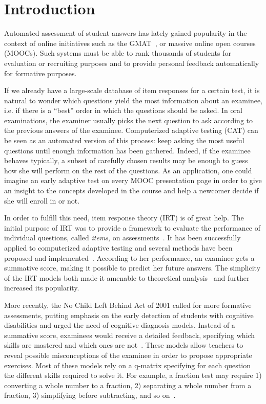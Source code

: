 \documentclass{edm_template}
\begin{document}

\newpage

\section{Introduction}
Automated assessment of student answers has lately gained popularity in the context of online initiatives such as the GMAT~\cite{Rudner2010}, or massive online open courses (MOOCs). Such systems must be able to rank thousands of students for evaluation or recruiting purposes and to provide personal feedback automatically for formative purposes.

If we already have a large-scale database of item responses for a certain test, it is natural to wonder which questions yield the most information about an examinee, i.e. if there is a ``best'' order in which the questions should be asked. In oral examinations, the examiner usually picks the next question to ask according to the previous answers of the examinee. Computerized adaptive testing (CAT) can be seen as an automated version of this process: keep asking the most useful questions until enough information has been gathered. Indeed, if the examinee behaves typically, a subset of carefully chosen results may be enough to guess how she will perform on the rest of the questions. As an application, one could imagine an early adaptive test on every MOOC presentation page in order to give an insight to the concepts developed in the course and help a newcomer decide if she will enroll in or not.

In order to fulfill this need, item response theory (IRT) is of great help. The initial purpose of IRT was to provide a framework to evaluate the performance of individual questions, called \emph{items}, on assessments~\cite{Hambleton1991}. It has been successfully applied to computerized adaptive testing and several methods have been proposed and implemented~\cite{Desmarais2012,Eggen2012,Huo2014}. According to her performance, an examinee gets a summative score, making it possible to predict her future answers. The simplicity of the IRT models both made it amenable to theoretical analysis~\cite{Baker2004} and further increased its popularity.

More recently, the No Child Left Behind Act of 2001 called for more formative assessments, putting emphasis on the early detection of students with cognitive disabilities and urged the need of cognitive diagnosis models. Instead of a summative score, examinees would receive a detailed feedback, specifying which skills are mastered and which ones are not~\cite{Cheng2009}. These models allow teachers to reveal possible misconceptions of the examinee in order to propose appropriate exercises. Most of these models rely on a q-matrix specifying for each question the different skills required to solve it. For example, a fraction test may require 1) converting a whole number to a fraction, 2) separating a whole number from a fraction, 3) simplifying before subtracting, and so on~\cite{DeLaTorreDouglas2004}.
\end{document}
